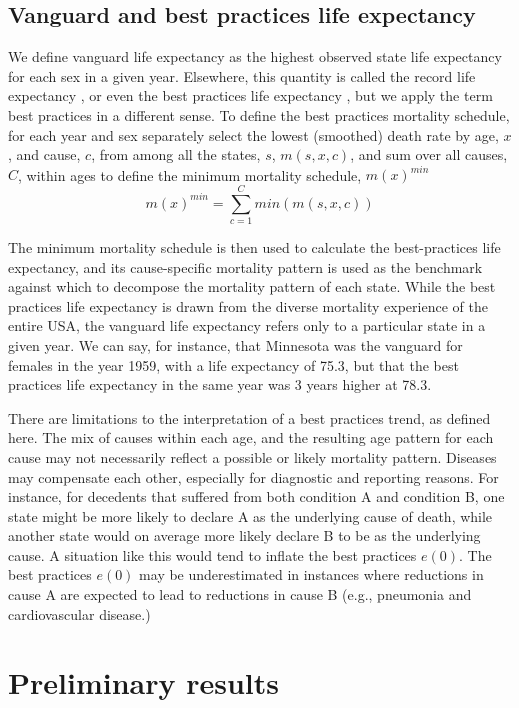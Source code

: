 \documentclass[11pt,oneside,a4paper]{article} %
\begin{document}
\subsection*{Vanguard and best practices life expectancy}
We define vanguard life expectancy as the highest
observed state life expectancy for each sex in a given year. Elsewhere, this
quantity is called the record life expectancy \citep{oeppen2002broken}, or even
the best practices life expectancy \citep{sanderson2004putting}, but we apply
the term best practices in a different sense. To define the best practices
mortality schedule, for each year and sex separately select the lowest
(smoothed) death rate by age, $x$, and cause, $c$, from among all the states, $s$, $m(s,x,c)$, and sum over
all causes, $C$, within ages to define the minimum mortality schedule,
$m(x)^{min}$
\begin{equation}
m(x)^{min} = \sum _{c=1}^C min(m(s,x,c))
\end{equation}

The minimum mortality schedule is then used to calculate the best-practices life
expectancy, and its cause-specific mortality pattern is used as the
benchmark against which to decompose the mortality pattern of each state. While
the best practices life expectancy is drawn from the diverse mortality
experience of the entire USA, the vanguard life expectancy refers only to a
particular state in a given year. We can say, for instance, that Minnesota was
the vanguard for females in the year 1959, with a life expectancy of 75.3, but
that the best practices life expectancy in the same year was 3 years
higher at 78.3.

There are limitations to the interpretation of a best practices trend, as
defined here. The mix of causes within each age, and the resulting age pattern
for each cause may not necessarily reflect a possible or likely mortality
pattern. Diseases may compensate each other, especially for
diagnostic and reporting reasons. For instance, for decedents that suffered
from both condition A and condition B, one state might be more likely to
declare A as the underlying cause of death, while another state would on
average more likely declare B to be as the underlying cause. A situation like
this would tend to inflate the best practices $e(0)$. The best practices $e(0)$ may
be underestimated in instances where reductions in cause A are expected to lead
to reductions in cause B (e.g., pneumonia and cardiovascular disease.)
\FloatBarrier
\section*{Preliminary results}
\FloatBarrier
\end{document}
